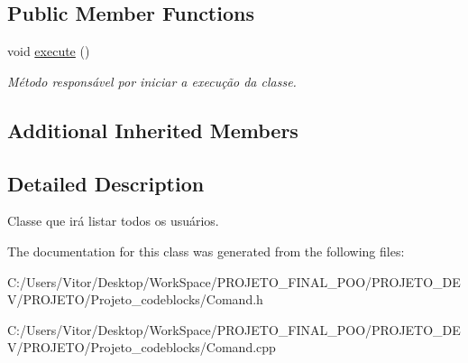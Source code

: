 \subsection*{Public Member Functions}
\begin{DoxyCompactItemize}
\item 
\hypertarget{class_command_find_users_ab33e1107a64b988eaa31bf1e7611c990}{void \hyperlink{class_command_find_users_ab33e1107a64b988eaa31bf1e7611c990}{execute} ()}\label{class_command_find_users_ab33e1107a64b988eaa31bf1e7611c990}

\begin{DoxyCompactList}\small\item\em Método responsável por iniciar a execução da classe. \end{DoxyCompactList}\end{DoxyCompactItemize}
\subsection*{Additional Inherited Members}


\subsection{Detailed Description}
Classe que irá listar todos os usuários. 

The documentation for this class was generated from the following files\-:\begin{DoxyCompactItemize}
\item 
C\-:/\-Users/\-Vitor/\-Desktop/\-Work\-Space/\-P\-R\-O\-J\-E\-T\-O\-\_\-\-F\-I\-N\-A\-L\-\_\-\-P\-O\-O/\-P\-R\-O\-J\-E\-T\-O\-\_\-\-D\-E\-V/\-P\-R\-O\-J\-E\-T\-O/\-Projeto\-\_\-codeblocks/Comand.\-h\item 
C\-:/\-Users/\-Vitor/\-Desktop/\-Work\-Space/\-P\-R\-O\-J\-E\-T\-O\-\_\-\-F\-I\-N\-A\-L\-\_\-\-P\-O\-O/\-P\-R\-O\-J\-E\-T\-O\-\_\-\-D\-E\-V/\-P\-R\-O\-J\-E\-T\-O/\-Projeto\-\_\-codeblocks/Comand.\-cpp\end{DoxyCompactItemize}
